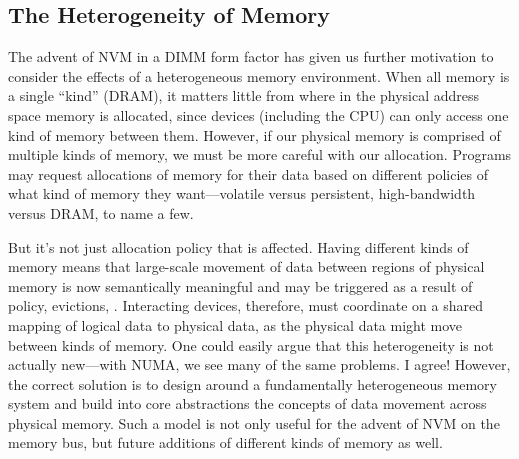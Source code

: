 \subsection{The Heterogeneity of Memory}

The advent of NVM in a DIMM form factor has given us further motivation to consider the effects of a heterogeneous
memory environment. When all memory is a single ``kind'' (\eg DRAM), it matters little from where in the physical
address space memory is allocated, since devices (including the CPU) can only access one kind of memory between
them. However, if our physical memory is comprised of multiple kinds of memory, we must be more careful with
our allocation. Programs may request allocations of memory for their data based on different policies of what kind of
memory they want---volatile versus persistent, high-bandwidth versus DRAM, to name a few.

But it's not just allocation policy that is affected. Having different kinds of memory means that large-scale movement
of data between regions of physical memory is now semantically meaningful and may be triggered as a result of policy,
evictions, \etc. Interacting devices, therefore, must coordinate on a shared mapping of logical data to physical data,
as the physical data might move between kinds of memory. One could easily argue that this heterogeneity is not actually
new---with NUMA, we see many of the same problems. I agree! However, the correct solution is to design around a
fundamentally heterogeneous memory system and build into core abstractions the concepts of data movement across physical
memory. Such a model is not only useful for the advent of NVM on the memory bus, but future additions of different kinds
of memory as well.

